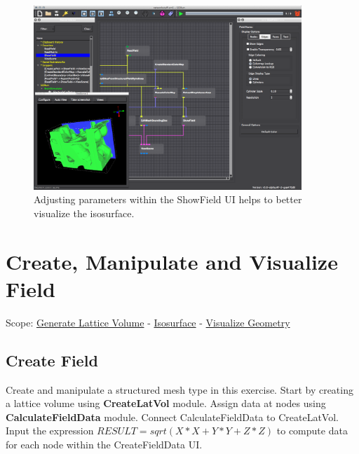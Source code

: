 \documentclass[fleqn,11pt,openany]{book}
\begin{document}
\begin{figure}[H]
\center
\includegraphics[width=0.9\textwidth]{BasicTutorial_figures/edgesiso.png}
\caption{Adjusting parameters within the ShowField UI helps to better visualize the isosurface.}
\label{fig:viewisosurf}
\end{figure}

\chapter{Create, Manipulate and Visualize Field}

\begin{introduction}
Scope: \hyperref[createfield]{Generate Lattice Volume} - \hyperref[isosurface2]{Isosurface} -
\hyperref[]{Visualize Geometry}
\end{introduction}

\section{Create Field}\label{createfield}

Create and manipulate a structured mesh type in this exercise.
Start by creating a lattice volume using \textbf{CreateLatVol} module.
Assign data at nodes using \textbf{CalculateFieldData} module.
Connect CalculateFieldData to CreateLatVol. Input the expression $RESULT = sqrt(X*X + Y*Y + Z*Z)$ to compute data for each node within the CreateFieldData UI.
\end{document}
